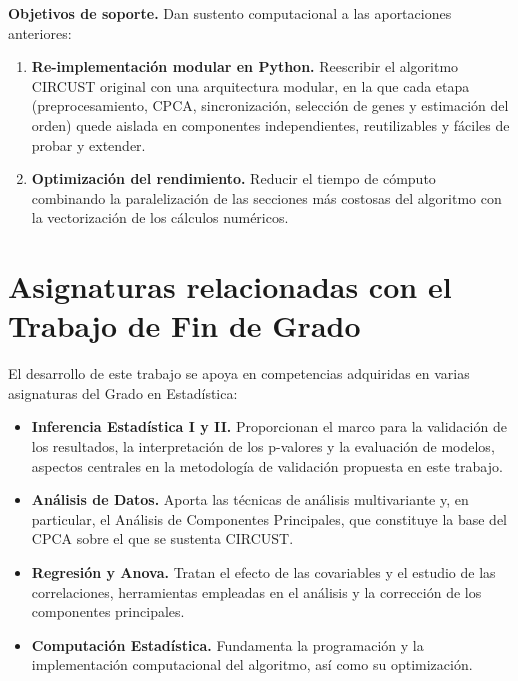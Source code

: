 \documentclass[12pt, a4paper]{report}
\begin{document}
\textbf{Objetivos de soporte.} Dan sustento computacional a las aportaciones anteriores:
\begin{enumerate}
    \item \textbf{Re-implementación modular en Python.} Reescribir el algoritmo CIRCUST original con una arquitectura modular, en la que cada etapa (preprocesamiento, CPCA, sincronización, selección de genes y estimación del orden) quede aislada en componentes independientes, reutilizables y fáciles de probar y extender.

    \item \textbf{Optimización del rendimiento.} Reducir el tiempo de cómputo combinando la paralelización de las secciones más costosas del algoritmo con la vectorización de los cálculos numéricos.
\end{enumerate}

\section{Asignaturas relacionadas con el Trabajo de Fin de Grado}

El desarrollo de este trabajo se apoya en competencias adquiridas en varias asignaturas del Grado en Estadística:

\begin{itemize}
    \item \textbf{Inferencia Estadística I y II.} Proporcionan el marco para la validación de los resultados, la interpretación de los p-valores y la evaluación de modelos, aspectos centrales en la metodología de validación propuesta en este trabajo.

    \item \textbf{Análisis de Datos.} Aporta las técnicas de análisis multivariante y, en particular, el Análisis de Componentes Principales, que constituye la base del CPCA sobre el que se sustenta CIRCUST.

    \item \textbf{Regresión y Anova.} Tratan el efecto de las covariables y el estudio de las correlaciones, herramientas empleadas en el análisis y la corrección de los componentes principales.

    \item \textbf{Computación Estadística.} Fundamenta la programación y la implementación computacional del algoritmo, así como su optimización.
\end{itemize}
\end{document}
